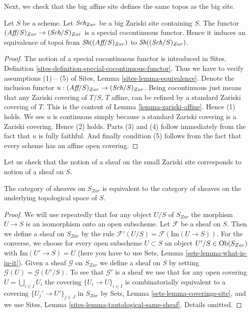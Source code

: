 \noindent
Next, we check that the big affine site defines the same
topos as the big site.

\begin{lemma}
\label{lemma-affine-big-site-Zariski}
Let $S$ be a scheme. Let $\textit{Sch}_{Zar}$ be a big Zariski
site containing $S$.
The functor $(\textit{Aff}/S)_{Zar} \to (\textit{Sch}/S)_{Zar}$
is a special cocontinuous functor. Hence it induces an equivalence
of topoi from $\mathop{\textit{Sh}}\nolimits((\textit{Aff}/S)_{Zar})$ to
$\mathop{\textit{Sh}}\nolimits((\textit{Sch}/S)_{Zar})$.
\end{lemma}

\begin{proof}
The notion of a special cocontinuous functor is introduced in
Sites, Definition \ref{sites-definition-special-cocontinuous-functor}.
Thus we have to verify assumptions (1) -- (5) of
Sites, Lemma \ref{sites-lemma-equivalence}.
Denote the inclusion functor
$u : (\textit{Aff}/S)_{Zar} \to (\textit{Sch}/S)_{Zar}$.
Being cocontinuous just means that any Zariski covering of
$T/S$, $T$ affine, can be refined by a standard Zariski covering of $T$.
This is the content of
Lemma \ref{lemma-zariski-affine}.
Hence (1) holds. We see $u$ is continuous simply because a standard
Zariski covering is a Zariski covering. Hence (2) holds.
Parts (3) and (4) follow immediately from the fact that $u$ is
fully faithful. And finally condition (5) follows from the
fact that every scheme has an affine open covering.
\end{proof}

\noindent
Let us check that the notion of a sheaf on the small Zariski site
corresponds to notion of a sheaf on $S$.

\begin{lemma}
\label{lemma-Zariski-usual}
The category of sheaves on $S_{Zar}$ is equivalent to the
category of sheaves on the underlying topological space of $S$.
\end{lemma}

\begin{proof}
We will use repeatedly that for any object
$U/S$ of $S_{Zar}$ the morphism $U \to S$ is an isomorphism
onto an open subscheme.
Let $\mathcal{F}$ be a sheaf on $S$. Then we define a sheaf
on $S_{Zar}$ by the rule $\mathcal{F}'(U/S) = \mathcal{F}(\text{Im}(U \to S))$.
For the converse, we choose for every open subscheme $U \subset S$ an object
$U'/S \in \mathop{\rm Ob}\nolimits(S_{Zar})$ with $\text{Im}(U' \to S) = U$
(here you have to use Sets, Lemma \ref{sets-lemma-what-is-in-it}).
Given a sheaf $\mathcal{G}$ on $S_{Zar}$ we define a sheaf on $S$ by setting
$\mathcal{G}(U) = \mathcal{G}(U'/S)$. To see that $\mathcal{G}'$ is
a sheaf we use that for any open covering $U = \bigcup_{i \in I} U_i$
the covering $\{U_i \to U\}_{i \in I}$
is combinatorially equivalent to a covering $\{U_j' \to U'\}_{j \in J}$
in $S_{Zar}$ by Sets, Lemma \ref{sets-lemma-coverings-site},
and we use Sites, Lemma \ref{sites-lemma-tautological-same-sheaf}.
Details omitted.
\end{proof}

